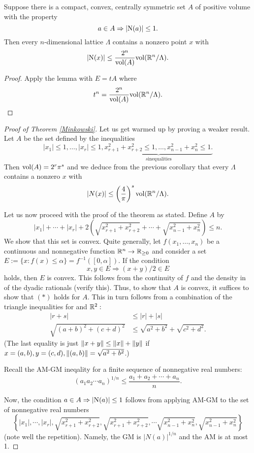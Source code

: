 \documentclass[10pt,a4paper,reqno]{amsart}
\begin{document}
\begin{cor}
Suppose there is a compact, convex, centrally symmetric set $A$ of positive
volume with the property \[a\in A \Rightarrow |\mathrm{N}(a)| \le 1.\] Then every
$n$-dimensional lattice $\Lambda$ contains a nonzero point $x$ with \[|\mathrm{N}(x)|
\le \frac{2^n}{\mathrm{vol}(A)} \mathrm{vol}(\mathbb{R}^n/\Lambda).\]
\end{cor}
\begin{proof}
Apply the lemma with $E = tA$ where \[t^n = \frac{2^n}{\mathrm{vol}(A)}
\mathrm{vol}(\mathbb{R}^n/\Lambda).\]
\end{proof}

\begin{proof}[Proof of Theorem \ref{Minkowski}]
Let us get warmed up by proving a weaker result. Let $A$ be the set defined by
the inequalities \[|x_1| \le 1, \dots, |x_r| \le 1,
\underbrace{x_{r+1}^2+x_{r+2}^2 \le 1, \dots,x_{n-1}^2+x_{n}^2\le 1.}_{s \text{
inequalities}}\] Then $\mathrm{vol}(A) = 2^r\pi^s$ and we deduce from the previous
corollary that every $\Lambda$ contains a nonzero $x$ with \[|N(x)| \le \left(
\frac{4}{\pi} \right)^s \mathrm{vol}(\mathbb{R}^n/\Lambda).\]

Let us now proceed with the proof of the theorem as stated. Define $A$ by
\[|x_1| + \cdots + |x_r| + 2\left( \sqrt{x_{r+1}^2+x_{r+2}^2} + \cdots +
\sqrt{x_{n-1}^2+x_{n}^2} \right) \le n.\] We show that this set is convex.
Quite generally, let $f(x_1,\dots,x_n)$ be a continuous and nonnegative
function $\mathbb{R}^n \rightarrow \mathbb{R}_{\ge 0}$ and consider a set $E := \{x : f(x) \le
\alpha\} = f^{-1}([0,\alpha])$. If the condition \[\tag{$*$} x,y \in E
\Rightarrow (x+y)/2 \in E\] holds, then $E$ is convex. This follows from the
continuity of $f$ and the density in \R{} of the dyadic rationals (verify
this). Thus, to show that $A$ is convex, it suffices to show that $(*)$ holds
for $A$. This in turn follows from a combination of the triangle inequalities
for \R{} and $\mathbb{R}^2:$ \begin{align*}
|r+s| & \le |r| + |s| \\
\sqrt{(a+b)^2+(c+d)^2} & \le \sqrt{a^2+b^2}+\sqrt{c^2+d^2}.
\end{align*} (The last equality is just $\| x+y\| \le \| x\|+\| y\|$ if
$x=(a,b),y=(c,d),\| (a,b)\| = \sqrt{a^2+b^2}$.)

Recall the AM-GM ineqality for a finite sequence of nonnegative real numbers:
\[ (a_1 a_2 \cdots a_n)^{1/n} \le \frac{a_1 + a_2 + \cdots + a_n}{n}.\]

Now, the condition $a\in A \Rightarrow |\mathrm{N}(a)| \le 1$ follows from applying
AM-GM to the set of nonnegative real numbers
\[\left\{
|x_1|,\cdots, |x_r|,
\sqrt{x_{r+1}^2+x_{r+2}^2},
\sqrt{x_{r+1}^2+x_{r+2}^2},
\cdots
\sqrt{x_{n-1}^2+x_{n}^2},
\sqrt{x_{n-1}^2+x_{n}^2} \right\}
\] (note well the repetition). Namely, the GM is $|N(a)|^{1/n}$ and the AM is
at most 1.


\end{proof}
\end{document}
